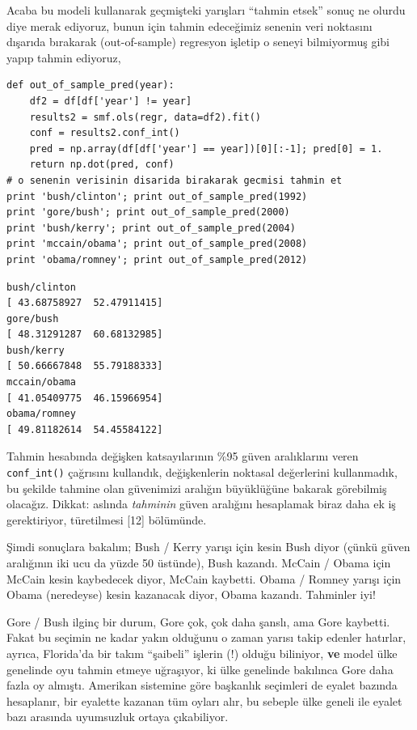 \documentclass[12pt,fleqn]{article}\usepackage{../../common}
\begin{document}
Acaba bu modeli kullanarak geçmişteki yarışları ``tahmin etsek'' sonuç ne olurdu
diye merak ediyoruz, bunun için tahmin edeceğimiz senenin veri noktasını
dışarıda bırakarak (out-of-sample) regresyon işletip o seneyi bilmiyormuş gibi
yapıp tahmin ediyoruz,

\begin{verbatim}
def out_of_sample_pred(year):
    df2 = df[df['year'] != year]
    results2 = smf.ols(regr, data=df2).fit()
    conf = results2.conf_int()
    pred = np.array(df[df['year'] == year])[0][:-1]; pred[0] = 1.
    return np.dot(pred, conf)
# o senenin verisinin disarida birakarak gecmisi tahmin et
print 'bush/clinton'; print out_of_sample_pred(1992)
print 'gore/bush'; print out_of_sample_pred(2000)
print 'bush/kerry'; print out_of_sample_pred(2004)
print 'mccain/obama'; print out_of_sample_pred(2008)
print 'obama/romney'; print out_of_sample_pred(2012)
\end{verbatim}

\begin{verbatim}
bush/clinton
[ 43.68758927  52.47911415]
gore/bush
[ 48.31291287  60.68132985]
bush/kerry
[ 50.66667848  55.79188333]
mccain/obama
[ 41.05409775  46.15966954]
obama/romney
[ 49.81182614  54.45584122]
\end{verbatim}

Tahmin hesabında değişken katsayılarının \%95 güven aralıklarını veren
\verb!conf_int()! çağrısını kullandık, değişkenlerin noktasal değerlerini
kullanmadık, bu şekilde tahmine olan güvenimizi aralığın büyüklüğüne bakarak
görebilmiş olacağız. Dikkat: aslında {\em tahminin} güven aralığını hesaplamak
biraz daha ek iş gerektiriyor, türetilmesi [12] bölümünde.

Şimdi sonuçlara bakalım; Bush / Kerry yarışı için kesin Bush diyor (çünkü güven
aralığının iki ucu da yüzde 50 üstünde), Bush kazandı. McCain / Obama için
McCain kesin kaybedecek diyor, McCain kaybetti. Obama / Romney yarışı için Obama
(neredeyse) kesin kazanacak diyor, Obama kazandı. Tahminler iyi!

Gore / Bush ilginç bir durum, Gore çok, çok daha şanslı, ama Gore
kaybetti. Fakat bu seçimin ne kadar yakın olduğunu o zaman yarısı takip edenler
hatırlar, ayrıca, Florida'da bir takım ``şaibeli'' işlerin (!)  olduğu
biliniyor, \textbf{ve} model ülke genelinde oyu tahmin etmeye uğraşıyor, ki ülke
genelinde bakılınca Gore daha fazla oy almıştı. Amerikan sistemine göre
başkanlık seçimleri de eyalet bazında hesaplanır, bir eyalette kazanan tüm
oyları alır, bu sebeple ülke geneli ile eyalet bazı arasında uyumsuzluk ortaya
çıkabiliyor.
\end{document}

